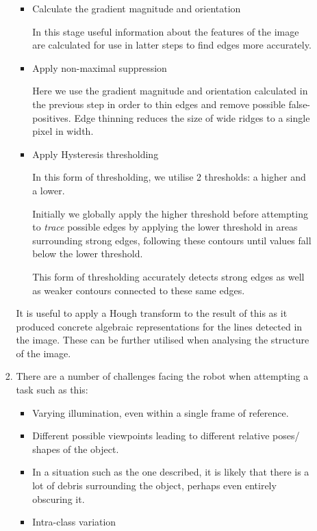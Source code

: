 \documentclass[12pt,a4paper]{article}
\begin{document}
\begin{enumerate}
\begin{enumerate}
\begin{enumerate}
\begin{itemize}
                                  \item Calculate the gradient magnitude and orientation

                                        In this stage useful information about the features of the image are calculated for use in latter steps to find edges more accurately.

                                  \item Apply non-maximal suppression

                                        Here we use the gradient magnitude and orientation calculated in the previous step in order to thin edges and remove possible false-positives. Edge thinning reduces the size of wide ridges to a single pixel in width.

                                  \item Apply Hysteresis thresholding

                                        In this form of thresholding, we utilise 2 thresholds: a higher and a lower.

                                        Initially we globally apply the higher threshold before attempting to \textit{trace} possible edges by applying the lower threshold in areas surrounding strong edges, following these contours until values fall below the lower threshold.

                                        This form of thresholding accurately detects strong edges as well as weaker contours connected to these same edges.
                                \end{itemize}

                                It is useful to apply a Hough transform to the result of this as it produced concrete algebraic representations for the lines detected in the image. These can be further utilised when analysing the structure of the image.

                          \item There are a number of challenges facing the robot when attempting a task such as this:

                                \begin{itemize}
                                  \item Varying illumination, even within a single frame of reference.
                                  \item Different possible viewpoints leading to different relative poses/ shapes of the object.
                                  \item In a situation such as the one described, it is likely that there is a lot of debris surrounding the object, perhaps even entirely obscuring it.
                                  \item Intra-class variation
                                \end{itemize}


\end{enumerate}
\end{enumerate}
\end{enumerate}
\end{document}
